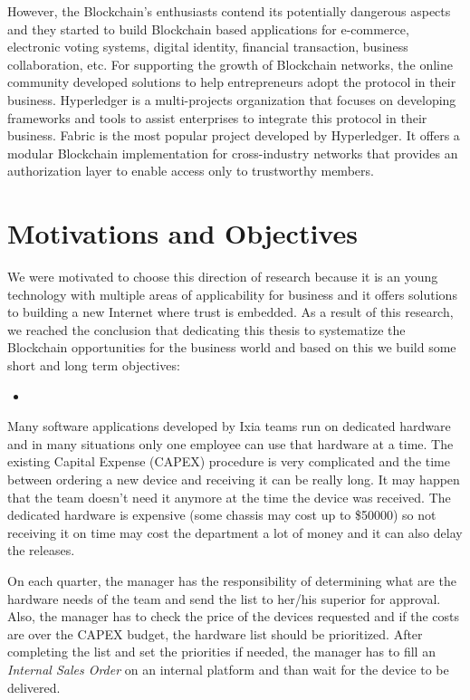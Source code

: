 However, the Blockchain's enthusiasts contend its potentially dangerous aspects and they started to build Blockchain based applications for e-commerce, electronic voting systems, digital identity, financial transaction, business collaboration, etc. For supporting the growth of Blockchain networks, the online community developed solutions to help entrepreneurs adopt the protocol in their business. 
Hyperledger is a multi-projects organization that focuses on developing frameworks and tools to assist enterprises to integrate this protocol in their business.
Fabric is the most popular project developed by Hyperledger. It offers a modular Blockchain implementation for cross-industry networks that provides an authorization layer to enable access only to trustworthy members. 


\section{Motivations and Objectives}
\label{sec:intro-section2}
We were motivated to choose this direction of research because it is an young technology with multiple areas of applicability for business and it offers solutions to building a new Internet where trust is embedded. As a result of this research, we reached the conclusion that dedicating this thesis to systematize the Blockchain opportunities for the business world and based on this we build some short and long term objectives:
\begin{itemize}
	\item
\end{itemize}



Many software applications developed by Ixia teams run on dedicated hardware and in many situations only one employee can use that hardware at a time.
The existing Capital Expense (CAPEX) procedure is very complicated and the time between ordering a new device and receiving it can be really long. It may happen that the team doesn't need it anymore at the time the device was received. The dedicated hardware is expensive (some chassis may cost up to \$50000) so not receiving it on time may cost the department a lot of money and it can also delay the releases.

On each quarter, the manager has the responsibility of determining what are the hardware needs of the team and send the list to her/his superior for approval.
Also, the manager has to check the price of the devices requested and if the costs are over the CAPEX budget, the hardware list should be prioritized. 
After completing the list and set the priorities if needed, the manager has to fill an \emph{Internal Sales Order} on an internal platform and than wait for the device to be delivered.

